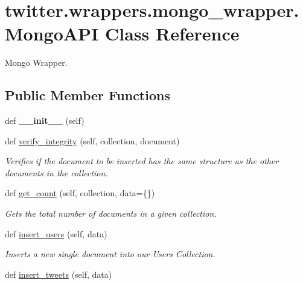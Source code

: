 \hypertarget{classtwitter_1_1wrappers_1_1mongo__wrapper_1_1MongoAPI}{}\section{twitter.\+wrappers.\+mongo\+\_\+wrapper.\+Mongo\+A\+PI Class Reference}
\label{classtwitter_1_1wrappers_1_1mongo__wrapper_1_1MongoAPI}


Mongo Wrapper.  


\subsection*{Public Member Functions}
\begin{DoxyCompactItemize}
\item 
\mbox{\label{classtwitter_1_1wrappers_1_1mongo__wrapper_1_1MongoAPI_afe7e92fefbe19be0561e810302fb4611}} 
def {\bfseries \+\_\+\+\_\+init\+\_\+\+\_\+} (self)
\item 
def \hyperlink{classtwitter_1_1wrappers_1_1mongo__wrapper_1_1MongoAPI_ad1adb6d5aa5e20cc43b77ab11d6403a3}{verify\+\_\+integrity} (self, collection, document)
\begin{DoxyCompactList}\small\item\em Verifies if the document to be inserted has the same structure as the other documents in the collection. \end{DoxyCompactList}\item 
def \hyperlink{classtwitter_1_1wrappers_1_1mongo__wrapper_1_1MongoAPI_a7c5d38f4ab2e2680224d47278b01d3bb}{get\+\_\+count} (self, collection, data=\{\})
\begin{DoxyCompactList}\small\item\em Gets the total number of documents in a given collection. \end{DoxyCompactList}\item 
def \hyperlink{classtwitter_1_1wrappers_1_1mongo__wrapper_1_1MongoAPI_a3f6edee30773ed114e48e32d54d45574}{insert\+\_\+users} (self, data)
\begin{DoxyCompactList}\small\item\em Inserts a new single document into our Users Collection. \end{DoxyCompactList}\item 
def \hyperlink{classtwitter_1_1wrappers_1_1mongo__wrapper_1_1MongoAPI_a83f45c0a62f892db52f103756a523716}{insert\+\_\+tweets} (self, data)

\end{DoxyCompactItemize}
